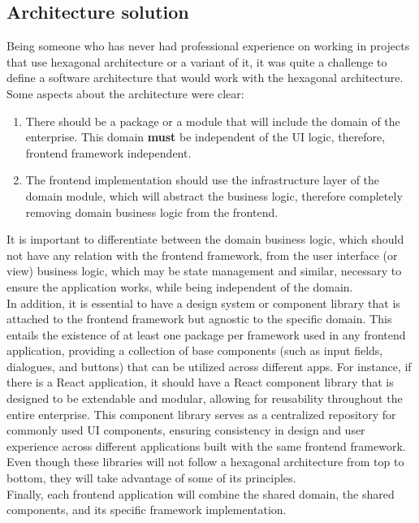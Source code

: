 \documentclass[../design.tex]{subfiles}
\begin{document}
\subsection{Architecture solution}
Being someone who has never had professional experience on working in projects
that use hexagonal architecture or a variant of it, it was quite a challenge to
define a software architecture that would work with the hexagonal architecture.
Some aspects about the architecture were clear:
\begin{enumerate}
	\item There should be a package or a module that will include the domain of
	      the enterprise. This domain \textbf{must} be independent of the UI logic,
	      therefore, frontend framework independent.
	\item The frontend implementation should use the infrastructure layer of the
	      domain module, which will abstract the business logic, therefore completely
	      removing domain business logic from the frontend.
\end{enumerate}
It is important to differentiate between the domain business logic, which should
not have any relation with the frontend framework, from the user interface (or
view) business logic, which may be state management and similar, necessary to
ensure the application works, while being independent of the domain.
\\[8pt]
In addition, it is essential to have a design system or component library that
is attached to the frontend framework but agnostic to the specific domain. This
entails the existence of at least one package per framework used in any frontend
application, providing a collection of base components (such as input fields,
dialogues, and buttons) that can be utilized across different apps. For instance,
if there is a React application, it should have a React component library that
is designed to be extendable and modular, allowing for reusability throughout
the entire enterprise. This component library serves as a centralized repository
for commonly used UI components, ensuring consistency in design and user
experience across different applications built with the same frontend framework.
\\
Even though these libraries will not follow a hexagonal architecture from top to
bottom, they will take advantage of some of its principles.
\\[8pt]
Finally, each frontend application will combine the shared domain, the shared
components, and its specific framework implementation.
\end{document}
